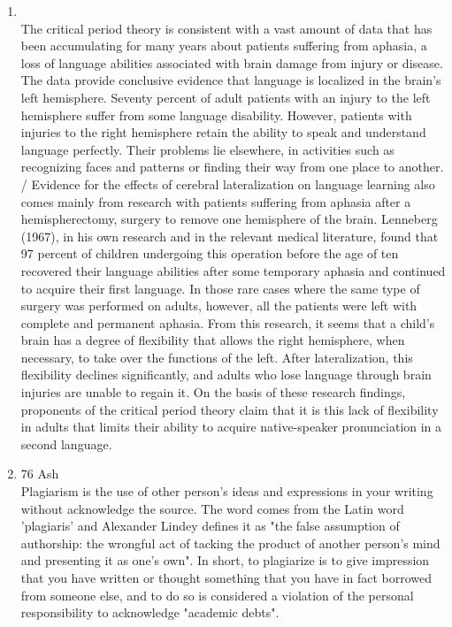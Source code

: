 \documentclass[12pt]{article}
\begin{document}
\begin{enumerate}
    \item {}\\
      The critical period theory is consistent with a vast amount of data that has been accumulating for many years about patients suffering from aphasia, a loss of language abilities associated with brain damage from injury or disease. The data provide conclusive evidence that language is localized in the brain’s left hemisphere. Seventy percent of adult patients with an injury to the left hemisphere suffer from some language disability. However, patients with injuries to the right hemisphere retain the ability to speak and understand language perfectly. Their problems lie elsewhere, in activities such as recognizing faces and patterns or finding their way from one place to another.\\
      /
      Evidence for the effects of cerebral lateralization on language learning also comes mainly from research with patients suffering from aphasia after a hemispherectomy, surgery to remove one hemisphere of the brain. Lenneberg (1967), in his own research and in the relevant medical literature, found that 97 percent of children undergoing this operation before the age of ten recovered their language abilities after some temporary aphasia and continued to acquire their first language. In those rare cases where the same type of surgery was performed on adults, however, all the patients were left with complete and permanent aphasia. From this research, it seems that a child’s brain has a degree of flexibility that allows the right hemisphere, when necessary, to take over the functions of the left. After lateralization, this flexibility declines significantly, and adults who lose language through brain injuries are unable to regain it. On the basis of these research findings, proponents of the critical period theory claim that it is this lack of flexibility in adults that limits their ability to acquire native-speaker pronunciation in a second language.

    \item 76 Ash\\
      Plagiarism is the use of other person's ideas and expressions in your writing without acknowledge the source. The word comes from the Latin word 'plagiaris' and Alexander Lindey defines it as "the false assumption of authorship: the wrongful act of tacking the product of another person's mind and presenting it as one's own". In short, to plagiarize is to give impression that you have written or thought something that you have in fact borrowed from someone else, and to do so is considered a violation of the personal responsibility to acknowledge "academic debts".\\


\end{enumerate}
\end{document}
